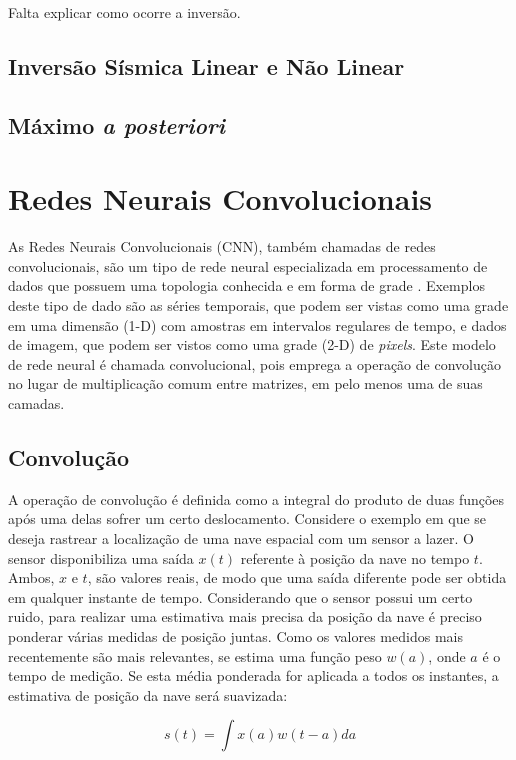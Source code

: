 Falta explicar como ocorre a inversão.
\subsection{Inversão Sísmica Linear e Não Linear}

\subsection{Máximo \textit{a posteriori}}

\section{Redes Neurais Convolucionais}
As Redes Neurais Convolucionais (CNN), também chamadas de redes convolucionais,
são um tipo de rede neural especializada em processamento de dados que possuem uma
topologia conhecida e em forma de grade \cite{Gdfl16}. Exemplos deste tipo de dado são as séries
temporais, que podem ser vistas como uma grade em uma dimensão (1-D) com amostras
em intervalos regulares de tempo, e dados de imagem, que podem ser vistos como
uma grade (2-D) de \textit{pixels}. Este modelo de rede neural é chamada convolucional,
pois emprega a operação de convolução no lugar de multiplicação comum entre matrizes,
em pelo menos uma de suas camadas.

\subsection{Convolução}
A operação de convolução é definida como a integral do produto de duas funções após uma delas sofrer um
certo deslocamento. Considere o exemplo em que se deseja rastrear a localização de uma
nave espacial com um sensor a lazer. O sensor disponibiliza uma saída $x(t)$ referente à posição da nave
no tempo $t$. Ambos, $x$ e $t$, são valores reais, de modo que uma saída diferente pode ser obtida
em qualquer instante de tempo. Considerando que o sensor possui um certo ruido, para realizar uma
estimativa mais precisa da posição da nave é preciso ponderar várias medidas de posição juntas.
Como os valores medidos mais recentemente são mais relevantes, se estima uma função peso
$w(a)$, onde $a$ é o tempo de medição. Se esta média ponderada for aplicada a todos os instantes,
a estimativa de posição da nave será suavizada:

\begin{equation}
 s(t) = \int{x(a) w(t-a)da}
 \label{eq:1}
\end{equation}

